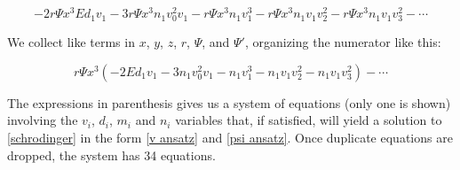 \documentclass{article}
\begin{document}
\begin{equation}
-2r\Psi x^3 E d_1 v_1 - 3r\Psi x^3 n_1 v_0^2 v_1 - r\Psi x^3 n_1 v_1^3 - r\Psi x^3 n_1 v_1 v_2^2 - r\Psi x^3 n_1 v_1 v_3^2 - \cdots
\end{equation}

We collect like terms in $x$, $y$, $z$, $r$, $\Psi$, and $\Psi'$, organizing the numerator like this:

\begin{equation}
r\Psi x^3 \left(-2 E d_1 v_1 - 3 n_1 v_0^2 v_1 - n_1 v_1^3 - n_1 v_1 v_2^2 - n_1 v_1 v_3^2\right) - \cdots
\end{equation}

The expressions in parenthesis gives us a system of equations (only one is shown)
involving the $v_i$, $d_i$, $m_i$ and $n_i$ variables that, if satisfied,
will yield a solution to \eqref{schrodinger} in the form \eqref{v ansatz} and \eqref{psi ansatz}.  Once
duplicate equations are dropped, the system has 34 equations.
\end{document}
